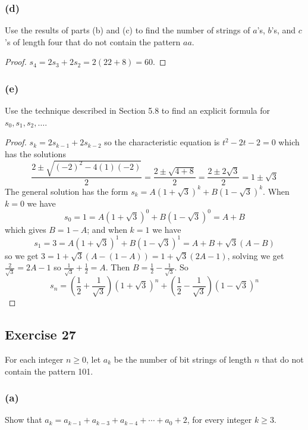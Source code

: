 \documentclass[14pt]{extarticle}
\begin{document}
\subsubsection{(d)}
Use the results of parts (b) and (c) to find the number of strings of $a$’s, $b$’s, and $c$’s of length four that do 
not contain the pattern $aa$.

\begin{proof}
\(s_4 = 2s_3 + 2s_2 = 2(22+8) = 60\).
\end{proof}

\subsubsection{(e)}
Use the technique described in Section 5.8 to find an explicit formula for \(s_0, s_1, s_2, \ldots\).

\begin{proof}
\(s_k = 2s_{k-1} + 2s_{k-2}\) so the characteristic equation is \(t^2 - 2t-2 = 0\) which has the solutions
\[
\frac{2 \pm \sqrt{(-2)^2 - 4(1)(-2)}}{2} = \frac{2 \pm \sqrt{4+8}}{2} = \frac{2 \pm 2\sqrt{3}}{2} = 1 \pm \sqrt{3}
\]
The general solution has the form \(s_k = A(1+\sqrt{3})^k + B(1-\sqrt{3})^k\). When $k=0$ we have
\[
s_0 = 1 = A(1+\sqrt{3})^0 + B(1-\sqrt{3})^0 = A+B
\]
which gives $B = 1-A$; and when $k=1$ we have 
\[
s_1 = 3 = A(1+\sqrt{3})^1 + B(1-\sqrt{3})^1 = A+B + \sqrt{3}(A-B)
\]
so we get \(3 = 1 + \sqrt{3}(A - (1-A)) = 1+\sqrt{3}(2A-1)\), solving we get \(\frac{2}{\sqrt{3}} = 2A-1\) so 
\(\frac{1}{\sqrt{3}} + \frac{1}{2} = A\). Then \(B = \frac{1}{2} - \frac{1}{\sqrt{3}}\). So
\[
s_n = \left(\frac{1}{2} + \frac{1}{\sqrt{3}}\right)(1+\sqrt{3})^n + \left(\frac{1}{2} - \frac{1}{\sqrt{3}}\right)
(1-\sqrt{3})^n
\]
\end{proof}

\subsection{Exercise 27}
For each integer \(n \geq 0\), let \(a_k\) be the number of bit strings of length $n$ that do not contain the pattern 
101.

\subsubsection{(a)}
Show that \(a_k = a_{k-1} + a_{k-3} + a_{k-4} + \cdots + a_0 + 2\), for every integer \(k \geq 3\).
\end{document}
